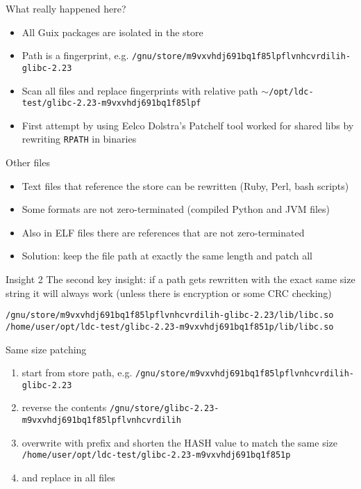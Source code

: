 \begin{frame}{What really happened here?}

  \begin{itemize}
  \item All Guix packages are isolated in the store
  \item Path is a fingerprint, e.g. \texttt{/gnu/store/m9vxvhdj691bq1f85lpflvnhcvrdilih-glibc-2.23}
  \item Scan all files and replace fingerprints with relative path \texttt{$\sim$/opt/ldc-test/glibc-2.23-m9vxvhdj691bq1f85lpf}
  \item First attempt by using Eelco Dolstra's Patchelf tool worked for shared libs by rewriting \texttt{RPATH} in binaries
  \end{itemize}
\end{frame}

\begin{frame}{Other files}
  \begin{itemize}
  \item Text files that reference the store can be rewritten (Ruby, Perl, bash scripts)
  \item Some formats are not zero-terminated (compiled Python and JVM files)
  \item Also in ELF files there are references that are not zero-terminated
  \item Solution: keep the file path at exactly the same length and patch all
  \end{itemize}
\end{frame}

\begin{frame}[fragile]{Insight 2}
  The second key insight: if a path gets rewritten with the exact same size
  string it will always work (unless there is encryption or some CRC checking)

\small
\begin{verbatim}
/gnu/store/m9vxvhdj691bq1f85lpflvnhcvrdilih-glibc-2.23/lib/libc.so
/home/user/opt/ldc-test/glibc-2.23-m9vxvhdj691bq1f851p/lib/libc.so
\end{verbatim}
\end{frame}


\begin{frame}{Same size patching}
  \begin{enumerate}
  \item start from store path, e.g.
    \texttt{/gnu/store/m9vxvhdj691bq1f85lpflvnhcvrdilih-glibc-2.23}
  \item reverse the contents
    \texttt{/gnu/store/glibc-2.23-m9vxvhdj691bq1f85lpflvnhcvrdilih}
  \item overwrite with prefix and shorten the HASH value to match the same size
  \texttt{/home/user/opt/ldc-test/glibc-2.23-m9vxvhdj691bq1f851p}
  \item and replace in all files
  \end{enumerate}
\end{frame}


